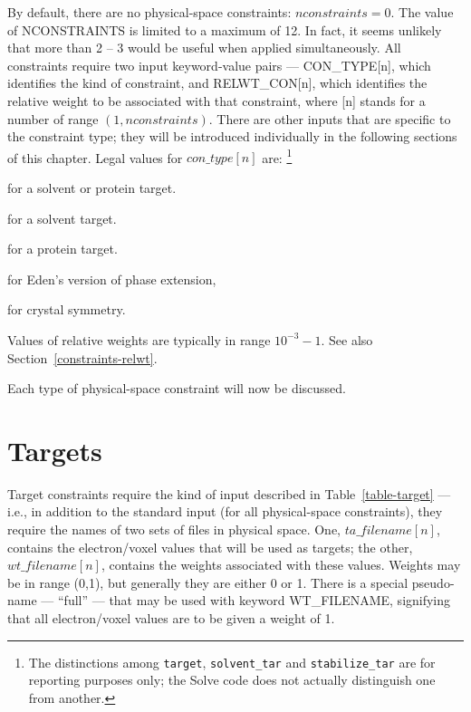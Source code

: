 \documentclass{report}
\begin{document}
{\vspace {0.1in}

By default, there are no physical-space constraints: $nconstraints = 0$.
The value of NCONSTRAINTS
 is limited to a maximum of 12.  In fact, it seems unlikely
that more than 2 -- 3 would be useful when applied simultaneously.
All constraints require two input keyword-value pairs --- CON\_TYPE[n], which
identifies the kind of constraint, and RELWT\_CON[n], 
which identifies the relative weight to be associated with that constraint,
where [n] stands for a number of range $(1, nconstraints)$.
There are other inputs that are specific to the constraint type; they will be
introduced individually in the following sections of this chapter.
Legal values for $con\_type[n]$ are: \footnote{The distinctions among 
{\tt target}, {\tt solvent\_tar} and {\tt stabilize\_tar} are for reporting
purposes only; the Solve code does not actually distinguish one from another.}

\vspace {0.1in}

 for a solvent or protein target.

 for a solvent target.

 for a protein target.

 for Eden's version of phase extension,

 for crystal symmetry.

% 

\vspace {0.1in}

Values of relative weights are typically in range $10^{-3} - 1$.
See also Section~\ref{constraints-relwt}.

\vspace {0.1in}

Each type of physical-space constraint will now be discussed.

\section {Targets}
\label{constraints-targets}

Target constraints require the kind of input described in 
Table~\ref{table-target} --- i.e., in addition to the standard input (for all
physical-space constraints), they require the names of two sets of
files in physical space.  One, $ta\_filename[n]$, contains the electron/voxel
values that will be used as targets; 
the other, $wt\_filename[n]$, contains the weights
associated with these values.  Weights may be in range (0,1),
but generally they are either 0 or 1.  There is a special 
pseudo-name --- ``full'' --- that may be used with keyword WT\_FILENAME,
signifying that all electron/voxel values are to be given a
weight of 1.

}
\end{document}

